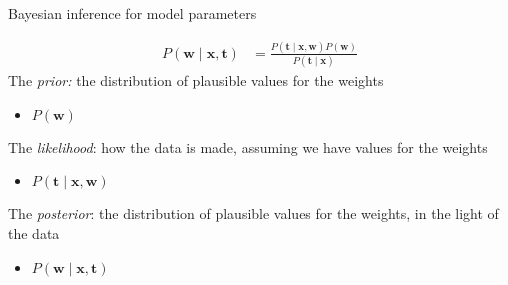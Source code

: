 \documentclass{hertieteaching}
\begin{document}
\begin{frame}{Bayesian inference for model parameters}

\begin{align*}
P(\mathbf{w} \mid \mathbf{x}, \mathbf{t})  & = \frac{P(\mathbf{t} \mid \mathbf{x}, \mathbf{w})P(\mathbf{w})}
          {P(\mathbf{t} \mid \mathbf{x})}
\end{align*}
The \textit{prior:} the distribution of plausible values for the weights
\begin{itemize}
  \item  $P(\mathbf{w})$
\end{itemize}
The \textit{likelihood}: how the data is made, assuming we have values for the weights
\begin{itemize}
  \item $P(\mathbf{t} \mid \mathbf{x}, \mathbf{w})$
\end{itemize}
The \textit{posterior}: the distribution of plausible values for the weights, in the light of the data
\begin{itemize}
\item $P(\mathbf{w} \mid \mathbf{x}, \mathbf{t})$ 
\end{itemize}

\end{frame}
\end{document}
